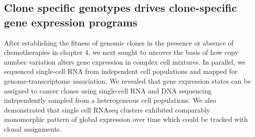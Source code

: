 \subsection{Clone specific genotypes drives clone-specific gene expression programs}

After establishing the fitness of genomic clones in the presence or absence of chemotherapies in chapter 4, we next sought to uncover the basis of how copy number variation alters gene expression in complex cell mixtures. In parallel, we sequenced single-cell RNA from independent cell populations and mapped for genome-transcriptome association. 
We revealed that gene expression states can be assigned to cancer clones using single-cell RNA and DNA sequencing independently sampled from a heterogeneous cell populations. We also demonstrated that single cell RNAseq clusters exhibited comparably monomorphic pattern of global expression over time which could be tracked with clonal assignments.


